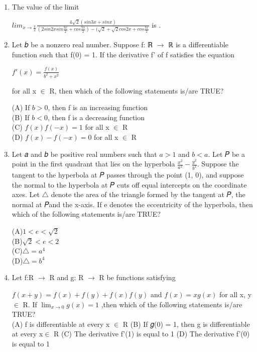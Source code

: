 \documentclass{article}
\begin{document}
\begin{enumerate}
\item The value of the limit
         
	 $lim_{x \to \frac{\pi}{2}}\frac{4\sqrt{2}(sin3x + sinx)}{(2 sin2xsin\frac{3x}{2} + cos\frac{5x}{2}) - (\sqrt{2}+\sqrt{2}cos2x + cos\frac{3x}{2}}$ is \underline{\hspace{1cm}}.

\item Let 𝑏 be a nonzero real number. Suppose f: ℝ $\to$ ℝ is a differentiable function such that f(0) = 1.
If the derivative f' of f satisfies the equation
               
	       $f'(x) = \frac{f(x)}{b^2 + x^2}$
	       
for all x $\in$ R, then which of the following statements is/are TRUE?

(A) If $b > 0$, then f is an increasing function\\
(B) If $b < 0$, then f is a decreasing function \\
(C) $f(x)f(-x) = 1$ for all x $\in$ R\\
(D) $f(x) - f(-x) = 0$ for all x $\in$ R

\item Let 𝑎 and 𝑏 be positive real numbers such that $a > 1$ and $b < a$. Let 𝑃 be a point in the first quadrant that lies on the hyperbola $\frac{x^2}{a^2} - \frac{y^2}{b^2}$. Suppose the tangent to the hyperbola at 𝑃 passes through the point (1, 0), and suppose the normal to the hyperbola at 𝑃 cuts off equal intercepts on the coordinate axes. Let $\triangle$ denote the area of the triangle formed by the tangent at 𝑃, the normal at 𝑃and the x-axis. If e denotes the eccentricity of the hyperbola, then which of the following statements is/are TRUE?
			
	
(A)$1< e <\sqrt{2}$\\
(B)$\sqrt{2}< e <2$\\
(C)$\triangle = a^4$\\
(D)$\triangle = b^4$
	

\item Let f:R $\to$ R and g: R $\to$ R be functions satisfying

$f(x + y) = f(x) + f(y) + f(x)f(y)$ and $f(x) = xg(x)$
for all x, y $\in$ R. If $\lim_{x \to 0}g(x) = 1$
,then which of the following statements is/are TRUE?\\

(A) f is differentiable at every x $\in$ R
(B) If 𝑔(0) = 1, then g is differentiable at every x$\in$ R
(C) The derivative f'(1) is equal to 1
(D) The derivative f'(0) is equal to 1


\end{enumerate}
\end{document}
